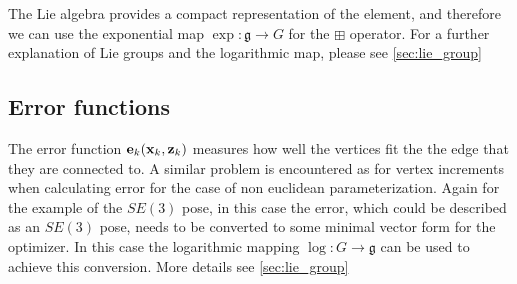 The Lie algebra provides a compact representation of the element, and therefore we can use the exponential map $\exp\colon \mathfrak g \to G$ for the $\boxplus$ operator.  For a further explanation of Lie groups and the logarithmic map, please see \ref{sec:lie_group}

\subsection{Error functions}

The error function $\mathbf e_k(\mathbf x_k, \mathbf z_k)$ measures how well the vertices fit the the edge that they are connected to.  A similar problem is encountered as for vertex increments when calculating error for the case of non euclidean parameterization.  Again for the example of the $SE(3)$ pose, in this case the error, which could be described as an $SE(3)$ pose, needs to be converted to some minimal vector form for the optimizer.  In this case the  logarithmic mapping $\log\colon G \to \mathfrak g$ can be used to achieve this conversion. More details see \ref{sec:lie_group}


